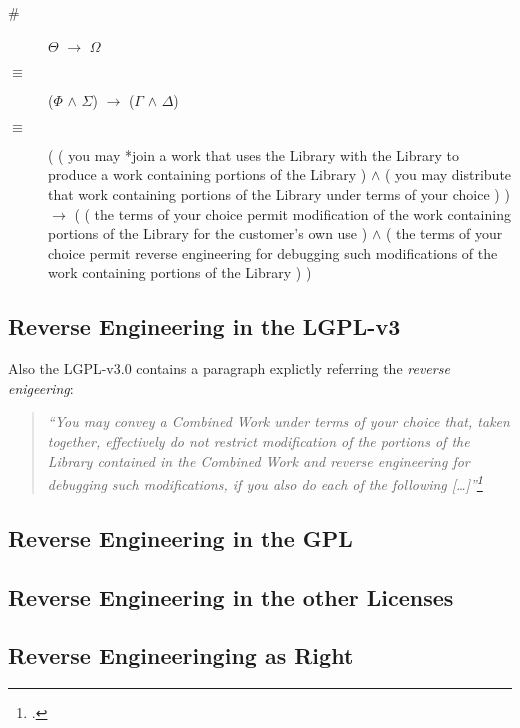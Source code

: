 \begin{description}
  \item[\#] $\Theta$ $\rightarrow$ $\Omega$
  \item[$\equiv$] ($\Phi$ $\wedge$ $\Sigma$) $\rightarrow$ ($\Gamma$ $\wedge$
  $\Delta$)
  \item[$\equiv$] 
( ( you may 
       *join a work that uses the Library with the Library
        to produce a work containing portions of the Library )
  $\wedge$
  ( you may 
        distribute that work containing portions of the Library
        under terms of your choice 
) )
$\rightarrow$
( ( the terms of your choice permit 
        modification of the work containing portions of 
        the Library for the customer's own use )
  $\wedge$
  ( the terms of your choice permit
        reverse engineering for debugging such modifications 
        of the work containing portions of the Library   
) )

\end{description}

\subsection{Reverse Engineering in the LGPL-v3}
Also the LGPL-v3.0 contains a paragraph explictly referring the \emph{reverse
enigeering}:


\begin{quote}\emph{
\enquote{You may convey a Combined Work under terms of your choice that,
taken together, effectively \emph{do not restrict} modification of the portions
of the Library contained in the Combined Work and \emph{reverse engineering} for
debugging such modifications, if you also do each of the following
[\ldots]}\footcite[cf.][\nopage wp]{Lgpl30OsiLicense2007a}}
\end{quote}


\subsection{Reverse Engineering in the GPL}

\subsection{Reverse Engineering in the other Licenses}

\subsection{Reverse Engineeringing as Right}

